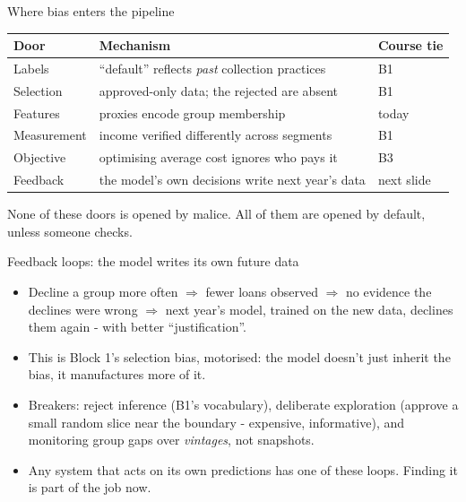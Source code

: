\documentclass[10pt,aspectratio=169]{beamer}
\begin{document}
\begin{frame}{Where bias enters the pipeline}
  \small
  \begin{center}
  \begin{tabular}{@{}lp{5.2cm}l@{}}
    \toprule
    Door & Mechanism & Course tie \\
    \midrule
    Labels & ``default'' reflects \emph{past} collection practices & B1 \\
    Selection & approved-only data; the rejected are absent & B1 \\
    Features & proxies encode group membership & today \\
    Measurement & income verified differently across segments & B1 \\
    Objective & optimising average cost ignores who pays it & B3 \\
    Feedback & the model's own decisions write next year's data & next slide \\
    \bottomrule
  \end{tabular}
  \end{center}
  \vspace{0.5em}
  \begin{center}
    None of these doors is opened by malice. All of them are opened by
    \alert{default}, unless someone checks.
  \end{center}
\end{frame}

\begin{frame}{Feedback loops: the model writes its own future data}
  \begin{itemize}
    \item Decline a group more often $\Rightarrow$ fewer loans observed
          $\Rightarrow$ \alert{no evidence the declines were wrong}
          $\Rightarrow$ next year's model, trained on the new data,
          declines them again - with better ``justification''.
    \item This is Block 1's selection bias, \alert{motorised}: the model
          doesn't just inherit the bias, it manufactures more of it.
    \item Breakers: reject inference (B1's vocabulary), deliberate
          exploration (approve a small random slice near the boundary -
          expensive, informative), and monitoring group gaps over
          \emph{vintages}, not snapshots.
    \item Any system that acts on its own predictions has one of these
          loops. Finding it is part of the job now.
  \end{itemize}
\end{frame}
\end{document}
